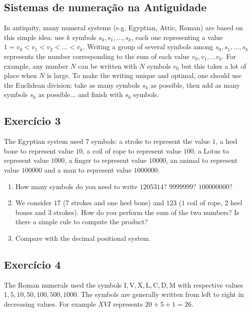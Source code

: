 \subsection*{Sistemas de numeração na Antiguidade}

In antiquity, many numeral systems (e.g. Egyptian, Attic, Roman) are based
on this simple idea: use $k$ symbols $s_0,s_1,\dots, s_k$, each one representing
a value $1 = v_0 < v_1 < v_2 < \dots < v_k$. Writing a group of several
symbols among $s_0, s_1, \dots, s_k$ represents the number corresponding
to the sum of each value $v_0, v_1, \dots v_k$. For example, any number $N$
can be written with $N$ symbols $v_0$ but this takes a lot of place when
$N$ is large. To make the writing unique and optimal, one should use the
Euclidean division: take as many symbols $s_k$ as possible, then add as many
symbols $s_k$ as possible... and finish with $s_0$ symbols.

\subsection*{Exercício 3}

The Egyptian system used $7$ symbols: a stroke to represent the value $1$,
a heel bone to represent value $10$, a coil of rope to represent value
$100$, a Lotus to represent value $1000$, a finger to represent value $10000$,
an animal to represent value $100000$ and a man to represent value $1000000$.

\begin{enumerate}
\item How many symbols do you need to write $1205314$? $9999999$? $100000000$?
\item We consider $17$ ($7$ strokes and one heel bone) and
  $123$ ($1$ coil of rope, $2$ heel bones and $3$ strokes). How do you perform
  the sum of the two numbers? Is there a simple rule to compute the product?
\item Compare with the decimal positional system.
\end{enumerate}

\subsection*{Exercício 4}

The Roman numerals used the symbols $\text{I},\text{V},\text{X},\text{L},\text{C},\text{D},\text{M}$ with respective values $1,5,10,50,100,500,1000$. The
symbols are generally written from left to right in decreasing values. For
example $XVI$ represents $20+5+1=26$.

